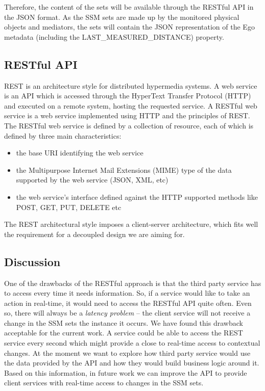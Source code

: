 Therefore, the content of the sets will be available through the RESTful API in the JSON format. As the SSM sets are made up by the monitored physical objects and mediators, the sets will contain the JSON representation of the Ego metadata (including the LAST\_MEASURED\_DISTANCE) property.\\
\subsection{RESTful API} %
\label{sec:rest_api}
REST is an architecture style for distributed hypermedia systems. A web service is an API which is accessed through the HyperText Transfer Protocol (HTTP) and executed on a remote system, hosting the requested service. A RESTful web service is a web service implemented using HTTP and the principles of REST. The RESTful web service is defined by a collection of resource, each of which is defined by three main characteristics:
\begin{itemize}
	\item the base URI identifying the web service
	\item the Multipurpose Internet Mail Extensions (MIME) type of the data supported by the web service (JSON, XML, etc)
	\item the web service's interface defined against the HTTP supported methods like POST, GET, PUT, DELETE etc
\end{itemize}

The REST architectural style imposes a client-server architecture, which fits well the requirement for a decoupled design we are aiming for.\\

\subsection{Discussion} %
\label{sec:api_discussion}
One of the drawbacks of the RESTful approach is that the third party service has to access every time it needs information. So, if a service would like to take an action in real-time, it would need to access the RESTful API quite often. Even so, there will always be a \emph{latency problem} -- the client service will not receive a change in the SSM sets the instance it occurs. We have found this drawback acceptable for the current work. A service could be able to access the REST service every second which might provide a close to real-time access to contextual changes. At the moment we want to explore how third party service would use the data provided by the API and how they would build business logic around it. Based on this information, in future work we can improve the API to provide client services with real-time access to changes in the SSM sets.\\ 

